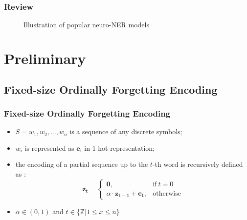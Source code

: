 \documentclass{beamer}
\begin{document}
\begin{frame}
\frametitle{Review}
\begin{figure}
	\centering
	\caption{\scriptsize Illustration of popular neuro-NER models}
\end{figure}
\end{frame}



\section{Preliminary}

\subsection{Fixed-size Ordinally Forgetting Encoding}

\begin{frame}
\frametitle{Fixed-size Ordinally Forgetting Encoding}
\begin{definition}[FOFE]
	\begin{itemize}
	\item $S = w_1, w_2, ..., w_n$ is a sequence of any discrete symbols;
	\item $w_i$ is represented as $\bm{e_i}$ in 1-hot representation;
	\item the encoding of a partial sequence up to the $t$-th word is recursively defined as \parencite{zhang2015fixed}:
	\begin{equation}
		\nonumber
		\bm{z_t}=
		\begin{cases}
		\bm{0}, & \text{if}\ t = 0 \\
		\alpha \cdot \bm{z_{t - 1}} + \bm{e_t}, & \text{otherwise}
		\end{cases}  \label{eq-fofe-def}
	\end{equation}
	\item $\alpha \in (0, 1)$ and $t \in \{{\mathbb Z}|1 \le x \le n\}$
	\end{itemize}
\end{definition}
\end{frame}
\end{document}
